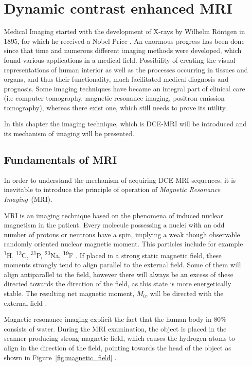 \chapter{Dynamic contrast enhanced MRI}
	
Medical Imaging started with the development of X-rays by Wilhelm Röntgen in 1895, for which he received a Nobel Price \cite{rontgen1896new}. 
An enormous progress has been done since that time and numerous different imaging methods were developed, which found various applications in a medical field. Possibility of creating the visual representations of human interior as well as the processes occurring in tissues and organs, and thus their functionality, much facilitated medical diagnosis and prognosis.   
Some imaging techniques have became an integral part of clinical care (i.e computer tomography, magnetic resonance imaging, positron emission tomography), whereas there exist one, which still needs to prove its utility. 

In this chapter the imaging technique, which is DCE-MRI will be introduced and its mechanism of imaging will be presented.

\section{Fundamentals of MRI}
In order to understand the mechanism of acquiring DCE-MRI sequences, it is inevitable to introduce the principle of operation of \textit{Magnetic Resonance Imaging}~(MRI).

MRI is an imaging technique based on the phenomena of induced nuclear  magnetism in the patient. Every molecule possessing a nuclei with an odd number of protons or neutrons  have a spin, implying a weak though observable randomly oriented nuclear magnetic moment. 
This particles include for example \textsuperscript{1}H, \textsuperscript{13}C, \textsuperscript{31}P, \textsuperscript{23}Na, \textsuperscript{19}F \nocite{bronzino1999biomedical}\cite{biomedical_hanbook_imaging, grover2015magnetic}. If placed in a strong static magnetic field, these moments strongly tend to align parallel to the external field. Some of them will align antiparallel to the field, however there will always be an excess of these directed towards the direction of the field, as this state is more energetically stable. The resulting net magnetic moment, $M_0$, will be directed with the external field \cite{bushong2014magnetic}.

Magnetic resonance imaging explicit the fact that the human body in 80\% consists of water. During the MRI examination, the object is placed in the scanner producing strong magnetic field, which causes the hydrogen atoms to align in the direction of the field, pointing towards the head of the object as shown in Figure~\ref{fig:magnetic_field} \cite{bushong2014magnetic}. 

